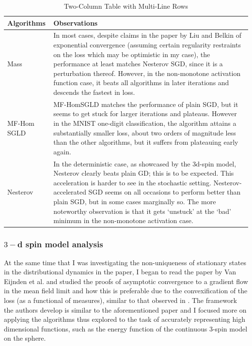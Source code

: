 \documentclass{article}
\begin{document}
\begin{table}[H]
\centering
\begin{tabular}{|p{7cm}|p{7cm}|} %
\hline
\textbf{Algorithms} & \textbf{Observations} \\
\hline\hline
Mass & In most cases, despite claims in the paper by Liu and Belkin \cite{liu2019acceleratingsgdmomentumoverparameterized} of exponential convergence (assuming certain regularity restraints on the loss which may be optimistic in my case), the performance at least matches Nesterov SGD, since it is a perturbation thereof. However, in the non-monotone activation function case, it beats all algorithms in later iterations and descends the fastest in loss.
\\
\hline
MF-Hom SGLD &MF-HomSGLD matches the performance of plain SGD, but it seems to get stuck for larger iterations and plateaus. However in the MNIST one-digit classification, the algorithm attains a substantially smaller loss, about two orders of magnitude less than the other algorithms, but it suffers from plateauing early again.
 \\
\hline
Nesterov & 	In the deterministic case, as showcased by the 3d-spin model, Nesterov clearly beats plain GD;  this is to be expected.
	This acceleration is harder to see in the stochastic setting. Nesterov-accelerated SGD seems on all occasions to perform better than plain SGD, but in some cases marginally so.
	The more noteworthy observation is that it gets ‘unstuck’ at the ‘bad’ minimum in the non-monotone activation case.
 \\
\hline
\end{tabular}
\caption{Two-Column Table with Multi-Line Rows}
\end{table}


\subsubsection{$ 3-$d spin model analysis}

At the same time that I was investigating the non-uniqueness of stationary states in the distributional dynamics in the \cite{Mei_2018} paper, I began to read the paper by Van Eijnden et al. \cite{Rotskoff_2022} and studied the proofs of asymptotic convergence to a gradient flow in the mean field limit and how this is preferable due to the convexification of the loss (as a functional of measures), similar to that observed in \cite{Mei_2018}. The framework the authors develop is similar to the aforementioned paper and I focused more on applying the algorithms thus explored to the task of accurately representing high dimensional functions, such as the energy function of the continuous 3-spin model on the sphere.\\
\end{document}
